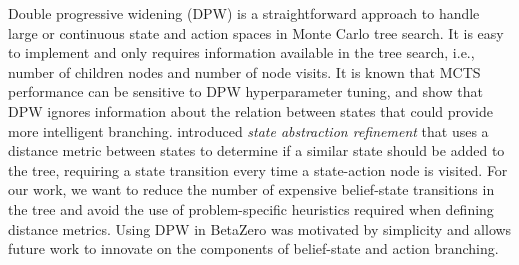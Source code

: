 Double progressive widening (DPW) is a straightforward approach to handle large or continuous state and action spaces in Monte Carlo tree search.
It is easy to implement and only requires information available in the tree search, i.e., number of children nodes and number of node visits.
It is known that MCTS performance can be sensitive to DPW hyperparameter tuning, and \textcite{sokota2021monte} show that DPW ignores information about the relation between states that could provide more intelligent branching.
\textcite{sokota2021monte} introduced \textit{state abstraction refinement} that uses a distance metric between states to determine if a similar state should be added to the tree, requiring a state transition every time a state-action node is visited.
For our work, we want to reduce the number of expensive belief-state transitions in the tree and avoid the use of problem-specific heuristics required when defining distance metrics.
Using DPW in BetaZero was motivated by simplicity and allows future work to innovate on the components of belief-state and action branching.


